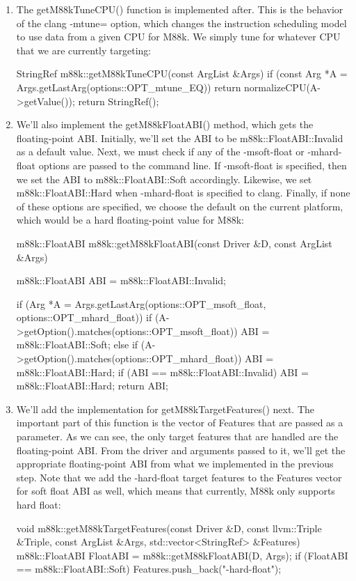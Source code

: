 \begin{enumerate}
\item
The getM88kTuneCPU() function is implemented after. This is the behavior of the clang -mtune= option, which changes the instruction scheduling model to use data from a given CPU for M88k. We simply tune for whatever CPU that we are currently targeting:

\begin{cpp}
StringRef m88k::getM88kTuneCPU(const ArgList &Args) {
    if (const Arg *A = Args.getLastArg(options::OPT_mtune_EQ))
        return normalizeCPU(A->getValue());
    return StringRef();
}
\end{cpp}

\item
We’ll also implement the getM88kFloatABI() method, which gets the floating-point ABI. Initially, we’ll set the ABI to be m88k::FloatABI::Invalid as a default value. Next, we must check if any of the -msoft-float or -mhard-float options are passed to the command line. If -msoft-float is specified, then we set the ABI to m88k::FloatABI::Soft accordingly. Likewise, we set m88k::FloatABI::Hard when -mhard-float is specified to clang. Finally, if none of these options are specified, we choose the default on the current platform, which would be a hard floating-point value for M88k:

\begin{cpp}
m88k::FloatABI m88k::getM88kFloatABI(const Driver &D, const
ArgList &Args) {
    m88k::FloatABI ABI = m88k::FloatABI::Invalid;

    if (Arg *A =
        Args.getLastArg(options::OPT_msoft_float,
    options::OPT_mhard_float)) {
        if (A->getOption().matches(options::OPT_msoft_float))
            ABI = m88k::FloatABI::Soft;
        else if (A->getOption().matches(options::OPT_mhard_float))
            ABI = m88k::FloatABI::Hard;
    }
    if (ABI == m88k::FloatABI::Invalid)
        ABI = m88k::FloatABI::Hard;
    return ABI;
}
\end{cpp}

\item
We’ll add the implementation for getM88kTargetFeatures() next. The important part of this function is the vector of Features that are passed as a parameter. As we can see, the only target features that are handled are the floating-point ABI. From the driver and arguments passed to it, we’ll get the appropriate floating-point ABI from what we implemented in the previous step. Note that we add the -hard-float target features to the Features vector for soft float ABI as well, which means that currently, M88k only supports hard float:

\begin{cpp}
void m88k::getM88kTargetFeatures(const Driver &D,
                                 const llvm::Triple &Triple,
                                 const ArgList &Args,
                                 std::vector<StringRef> &Features) {
    m88k::FloatABI FloatABI = m88k::getM88kFloatABI(D, Args);
    if (FloatABI == m88k::FloatABI::Soft)
        Features.push_back("-hard-float");
}
\end{cpp}

\end{enumerate}


